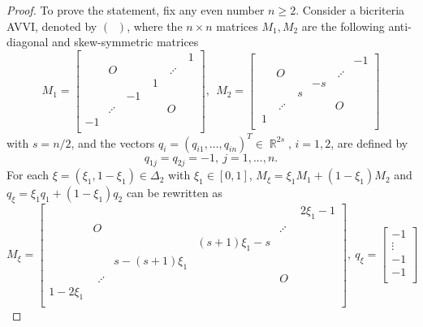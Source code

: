 \documentclass[smallextended,envcountsect]{svjour3}       %
\DeclareMathOperator{\Pone}{P_0}
\DeclareMathOperator{\R}{\mathbb{R}}
\begin{document}
\begin{proof} To prove the statement, fix any even number $n\geq 2$. Consider a bicriteria AVVI, denoted by $(\Pone)$, where the  $n\times n$ matrices $M_1,M_2$ are the following anti-diagonal and skew-symmetric matrices 
\begin{equation}\label{matrixM12}M_1=\begin{bmatrix}
	&  &  &&  & \ 1  \\ 
	&   O& & 	  & \ \iddots   &	\\ 
	&     && \ 1   &   &\\ 
	&    &-1 & &  &	\\ 
&  \iddots   & && O  &\\ 
	-1& &&& &  \\ 
	\end{bmatrix}, \  \ M_2=\begin{bmatrix}
	&  &  &&  &-1  \\ 
	&   O& & 	  & \ \iddots   &	\\ 
	&     &&-s   &   &\\ 
	&    & \ s & &  &	\\ 
	& \ \iddots   & && O  &\\ 
	\ 1& &&& &  \\ 
	\end{bmatrix}\end{equation}
with $s=n/2$, and the vectors $q_i=(q_{i1},\dots,q_{in})^T\in \R^{2s}$, $i=1,2$, are defined by
	\begin{equation}\label{matrixq}
q_{1j}=q_{2j}=
-1, \ j=1,...,n.
	\end{equation}
For each $\xi=(\xi_1,1-\xi_1)\in \Delta_2$ with $\xi_1\in [0,1]$,  $M_{\xi}=\xi_1M_1+(1-\xi_1)M_2$ and $q_{\xi}=\xi_1q_1+(1-\xi_1)q_2$ can be rewritten as
	$$M_{\xi}=\begin{bmatrix}
	&  &  &&  & 2\xi_1-1  \\ 
	&   O& & 	  & \iddots \ \   &	\\ 
	&     && (s+1)\xi_1-s   &   &\\ 
	&    &s-(s+1)\xi_1& &  &	\\ 
	& \ \ \iddots   & && O  &\\ 
	1-2\xi_1& &&& &  \\ 
	\end{bmatrix}, \ 
	q_{\xi}=\begin{bmatrix}
	-1 \\ 
	\vdots\\
	-1\\
	-1\\

\end{bmatrix}$$
\end{proof}
\end{document}
